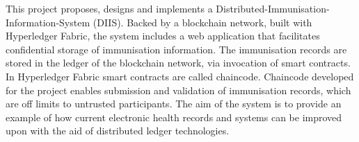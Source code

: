 This project proposes, designs and implements a Distributed-Immunisation-Information-System (DIIS).
Backed by a blockchain network, built with Hyperledger Fabric, the system includes a web application that facilitates confidential storage of immunisation information. 
The immunisation records are stored in the ledger of the blockchain network, via invocation of smart contracts. In Hyperledger Fabric smart contracts are called chaincode.
Chaincode developed for the project enables submission and validation of immunisation records, which are off limits to untrusted participants. 
The aim of the system is to provide an example of how current electronic health records and systems can be improved upon with the aid of distributed ledger technologies. 